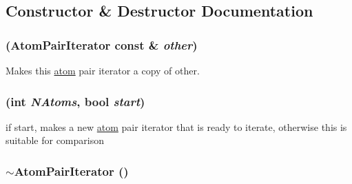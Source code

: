 \subsection{Constructor \& Destructor Documentation}
\hypertarget{classJKBuilder_1_1AtomPairIterator_a696744d82a9bb3feee21a96f450a510b}{
\subsubsection[{AtomPairIterator}]{ ({\bf AtomPairIterator} const \& {\em other})}}
\label{classJKBuilder_1_1AtomPairIterator_a696744d82a9bb3feee21a96f450a510b}


Makes this \hyperlink{classJKBuilder_1_1atom}{atom} pair iterator a copy of other. \hypertarget{classJKBuilder_1_1AtomPairIterator_ad5df59ed812804b6371f17eabeb7d261}{
\subsubsection[{AtomPairIterator}]{ (int {\em NAtoms}, \/  bool {\em start})}}
\label{classJKBuilder_1_1AtomPairIterator_ad5df59ed812804b6371f17eabeb7d261}


if start, makes a new \hyperlink{classJKBuilder_1_1atom}{atom} pair iterator that is ready to iterate, otherwise this is suitable for comparison \hypertarget{classJKBuilder_1_1AtomPairIterator_aa26e88e305008d272c920bf0b959e96b}{
\subsubsection[{$\sim$AtomPairIterator}]{\setlength{\rightskip}{0pt plus 5cm}$\sim${\bf AtomPairIterator} ()}}
\label{classJKBuilder_1_1AtomPairIterator_aa26e88e305008d272c920bf0b959e96b}


